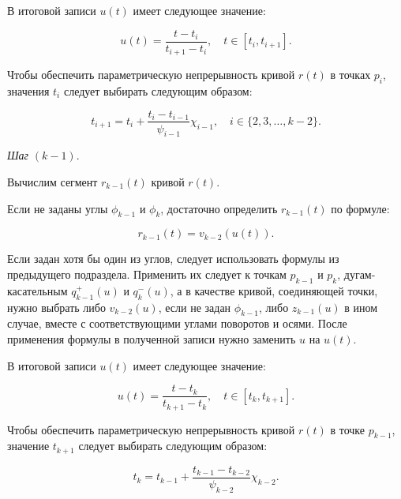 В итоговой записи $u(t)$ имеет следующее значение:

$$
u(t)=\frac{t-t_i}{t_{i+1}-t_i}, \quad t \in [t_i,t_{i+1}].
$$

Чтобы обеспечить параметрическую непрерывность кривой $r(t)$ в точках $p_i$, значения $t_i$ следует выбирать
следующим образом:

$$
t_{i+1}=t_i+\frac{t_i-t_{i-1}}{\psi_{i-1}}\chi_{i-1}, \quad i \in \{2,3,\dots,k-2\}.
$$

\bigskip
\textit{Шаг} $(k-1)$.

Вычислим сегмент $r_{k-1}(t)$ кривой $r(t)$.

Если не заданы углы $\phi_{k-1}$ и $\phi_k$, достаточно определить $r_{k-1}(t)$ по формуле:

$$
r_{k-1}(t)=v_{k-2}(u(t)).
$$

Если задан хотя бы один из углов, следует использовать формулы из предыдущего подраздела. Применить их следует к
точкам $p_{k-1}$ и $p_k$, дугам-касательным $q_{k-1}^+(u)$ и $q_k^-(u)$, а в качестве кривой, соединяющей точки,
нужно выбрать либо $v_{k-2}(u)$, если не задан $\phi_{k-1}$, либо $z_{k-1}(u)$ в ином случае, вместе с соответствующими
углами поворотов и осями. После применения формулы в полученной записи нужно заменить $u$ на $u(t)$.

В итоговой записи $u(t)$ имеет следующее значение:

$$
u(t)=\frac{t-t_k}{t_{k+1}-t_k}, \quad t \in [t_k,t_{k+1}].
$$

Чтобы обеспечить параметрическую непрерывность кривой $r(t)$ в точке $p_{k-1}$, значение $t_{k+1}$ следует выбирать
следующим образом:

$$
t_k=t_{k-1}+\frac{t_{k-1}-t_{k-2}}{\psi_{k-2}}\chi_{k-2}.
$$
